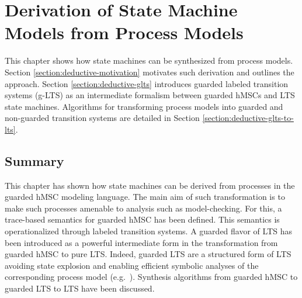 \chapter{Derivation of State Machine Models from Process Models\label{chapter:deductive}}

This chapter shows how state machines can be synthesized from process models. Section \ref{section:deductive-motivation} motivates such derivation and outlines the approach. Section \ref{section:deductive-glts} introduces guarded labeled transition systems (g-LTS) as an intermediate formalism between guarded hMSCs and LTS state machines. Algorithms for transforming process models into guarded and non-guarded transition systems are detailed in Section \ref{section:deductive-glts-to-lts}.





\section*{Summary}

This chapter has shown how state machines can be derived from processes in the guarded hMSC modeling language. The main aim of such transformation is to make such processes amenable to analysis such as model-checking. For this, a trace-based semantics for guarded hMSC has been defined. This semantics is operationalized through labeled transition systems. A guarded flavor of LTS has been introduced as a powerful intermediate form in the transformation from guarded hMSC to pure LTS. Indeed, guarded LTS are a structured form of LTS avoiding state explosion and enabling efficient symbolic analyses of the corresponding process model (e.g.~\cite{Damas:2011}). Synthesis algorithms from guarded hMSC to guarded LTS to LTS have been discussed.
